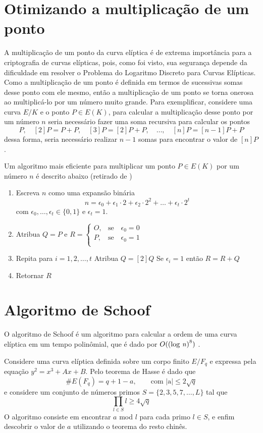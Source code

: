 \begin{apendicesenv}

\partapendices

\chapter{Otimizando a multiplicação de um ponto}

A multiplicação de um ponto da curva elíptica é de extrema importância para a criptografia de curvas elípticas, pois, como foi visto, sua segurança depende da dificuldade em resolver o Problema do Logaritmo Discreto para Curvas Elípticas. Como a multiplicação de um ponto é definida em termos de sucessivas somas desse ponto com ele mesmo, então a multiplicação de um ponto se torna onerosa ao multiplicá-lo por um número muito grande. Para exemplificar, considere uma curva $E/K$ e o ponto $P \in E(K)$, para calcular a multiplicação desse ponto por um número $n$ seria necessário fazer uma soma recursiva para calcular os pontos
$$
P,\quad [2]P = P + P,\quad [3]P = [2]P + P,\quad \dots,\quad [n]P = [n-1]P + P
$$
dessa forma, seria necessário realizar $n-1$ somas para encontrar o valor de $[n]P$. \cite{Silverman:2009}

Um algoritmo mais eficiente para multiplicar um ponto $P \in E(K)$ por um número $n$ é descrito abaixo (retirado de \cite{Silverman:2009})

\begin{enumerate}
  \item Escreva $n$ como uma expansão binária $$n = \epsilon_0 + \epsilon_1 \cdot 2 + \epsilon_2 \cdot 2^2 + \dots + \epsilon_t \cdot 2^t$$
com $\epsilon_0, \dots, \epsilon_t \in \{0, 1\}$ e $\epsilon_t = 1$.
  \item Atribua $Q = P$ e
	$
	R = \begin{cases}
	O, &\mbox{se} \quad\epsilon_0 = 0\\
	P, &\mbox{se} \quad\epsilon_0 = 1\\
	\end{cases}
	$
  \item Repita para $i = 1, 2, \dots, t$
    \subitem Atribua $Q = [2]Q$
    \subitem Se $\epsilon_i = 1$ então $R = R + Q$
  \item Retornar $R$
\end{enumerate}

\chapter{Algoritmo de Schoof}

O algoritmo de Schoof é um algoritmo para calcular a ordem de uma curva elíptica em um tempo polinômial, que é dado por $O(\mbox{(log \textit{n})}^8)$ \cite{Silverman:2009}.

Considere uma curva elíptica definida sobre um corpo finito $E/F_q$ e expressa pela equação $y^2 = x^3 + Ax + B$. Pelo teorema de Hasse é dado que
$$
\#E(F_q) = q + 1 - a, \qquad \mbox{com |a|} \leq 2 \sqrt{q}
$$
e considere um conjunto de números primos $S = \{2,3,5,7,\dots,L\}$ tal que 
$$
\prod_{l \in S} l \geq 4 \sqrt{q}
$$
O algoritmo consiste em encontrar $a$ mod $l$ para cada primo $l \in S$, e enfim descobrir o valor de $a$ utilizando o teorema do resto chinês.
\end{apendicesenv}
